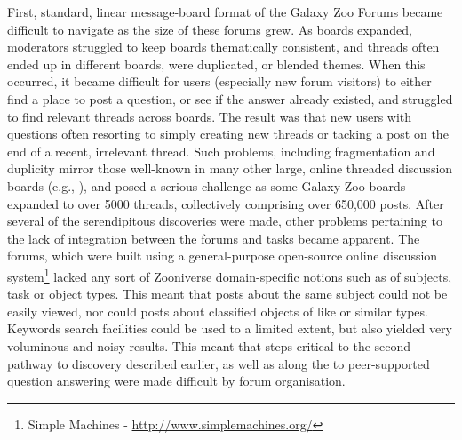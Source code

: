 \documentclass{sigchi}
\begin{document}
First, standard, linear message-board format of the Galaxy Zoo Forums became difficult to navigate as the size of these forums grew.  As boards expanded, moderators struggled to keep boards thematically consistent, and threads often ended up in different boards, were duplicated, or blended themes.  When this occurred, it became difficult for users (especially new forum visitors) to either find a place to post a question, or see if the answer already existed, and struggled to find relevant threads across boards.  The result was that new users with questions often resorting to simply creating new threads or tacking a post on the end of a recent, irrelevant thread.  Such problems, including fragmentation and duplicity mirror those well-known  in many other large, online threaded discussion boards (e.g., \cite{murphy2004graduate}), and posed a serious challenge as some Galaxy Zoo boards expanded to over 5000 threads, collectively comprising over 650,000 posts. 
After several of the serendipitous discoveries were made, other problems pertaining to the lack of integration between the forums and tasks became apparent.  The forums, which were built using a general-purpose open-source online discussion system\footnote{Simple Machines - \url{http://www.simplemachines.org/}} lacked any sort of Zooniverse domain-specific notions such as of subjects, task or object types. This meant that posts about the same subject could not be easily viewed, nor could posts about classified objects of like or similar types.  Keywords search facilities could be used to a limited extent, but also yielded very voluminous and noisy results. This meant that steps critical to the second pathway to discovery described earlier, as well as along the to peer-supported question answering were made difficult by forum organisation.

\end{document}
